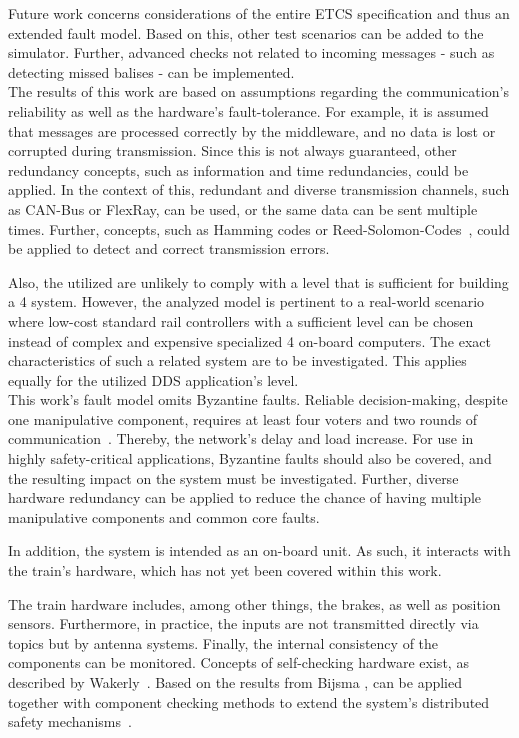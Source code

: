 Future work concerns considerations of the entire ETCS specification and thus an extended fault model.
Based on this, other test scenarios can be added to the simulator.
Further, advanced checks not related to incoming messages - such as detecting missed balises - can be implemented.
\\

The results of this work are based on assumptions regarding the communication's reliability as well as the hardware's fault-tolerance.
For example, it is assumed that messages are processed correctly by the middleware, and no data is lost or corrupted during transmission.
Since this is not always guaranteed, other redundancy concepts, such as information and time redundancies, could be applied.
In the context of this, redundant and diverse transmission channels, such as CAN-Bus or FlexRay, can be used, or the same data can be sent multiple times.
Further,  concepts, such as Hamming codes or Reed-Solomon-Codes~\cite{ReedSolomonCodes}, could be applied to detect and correct transmission errors.

Also, the utilized  are unlikely to comply with a  level that is sufficient for building a  4 system.
However, the analyzed model is pertinent to a real-world scenario where low-cost standard rail controllers with a sufficient  level can be chosen instead of complex and expensive specialized  4 on-board computers.
The exact characteristics of such a related system are to be investigated.
This applies equally for the utilized DDS application's  level.
\\

This work's fault model omits Byzantine faults.
Reliable decision-making, despite one manipulative component, requires at least four voters and two rounds of communication~\cite{GamerIncreasingMOON}.
Thereby, the network's delay and load increase.
For use in highly safety-critical applications, Byzantine faults should also be covered, and the resulting impact on the system must be investigated.
Further, diverse hardware redundancy can be applied to reduce the chance of having multiple manipulative components and common core faults.

In addition, the system is intended as an  on-board unit.
As such, it interacts with the train's hardware, which has not yet been covered within this work.

The train hardware includes, among other things, the brakes, as well as position sensors.
Furthermore, in practice, the inputs are not transmitted directly via  topics but by antenna systems.
Finally, the internal consistency of the components can be monitored.
Concepts of self-checking hardware exist, as described by Wakerly~\cite{SelfCheckingProcessorDesign}.
Based on the results from Bijsma \etal,  can be applied together with component checking methods to extend the system's distributed safety mechanisms~\cite{DistributedSafety2020}.